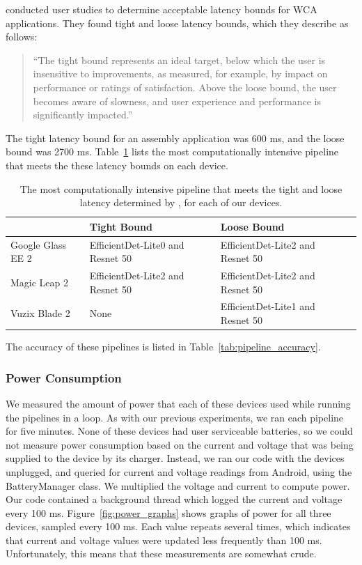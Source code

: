 \citet{chen2017} conducted user studies to determine acceptable latency bounds
for WCA applications.
They found tight and loose latency bounds, which they describe as follows:
\begin{quotation}
``The tight bound represents an ideal target, below which the
user is insensitive to improvements, as measured, for example,
by impact on performance or ratings of satisfaction. Above
the loose bound, the user becomes aware of slowness, and
user experience and performance is significantly impacted.''
\end{quotation}
The tight latency bound for an assembly application was 600 ms, and the loose
bound was 2700 ms. Table~\ref{tab:mobile_accuracy} lists the most
computationally intensive pipeline
that meets the these latency bounds on each device.

\begin{table}
\begin{tabular}{|l||l|l|l|}
  \hline
  & Tight Bound & Loose Bound\\
  \hline
  \hline
  Google Glass EE 2 & EfficientDet-Lite0 and Resnet 50 & EfficientDet-Lite2 and Resnet 50\\
  Magic Leap 2 & EfficientDet-Lite2 and Resnet 50 & EfficientDet-Lite2 and Resnet 50\\
  Vuzix Blade 2 & None & EfficientDet-Lite1 and Resnet 50\\
  \hline
\end{tabular}
  \begin{captiontext}
    The accuracy of these pipelines is listed in
    Table~\ref{tab:pipeline_accuracy}.
  \end{captiontext}
\caption{
  The most computationally intensive pipeline that meets the tight and loose
  latency determined by \citet{chen2017}, for each of our devices.
  }\label{tab:mobile_accuracy}
\end{table}

\subsubsection{Power Consumption}\label{sec:mobile_power_consumption}

We measured the amount of power that each of these devices used while running
the pipelines in a loop.
As with our previous experiments, we ran each pipeline for five minutes.
None of these devices had user serviceable batteries, so we could not measure
power consumption based on the current and voltage that was being
supplied to the device by its charger.
Instead, we ran our code with the devices unplugged, and queried for current and
voltage readings from Android, using the BatteryManager class.
We multiplied the voltage and current to compute power.
Our code contained a background thread which logged the current and voltage
every 100 ms.
Figure~\ref{fig:power_graphs} shows graphs of power for all three devices,
sampled every 100 ms.
Each value repeats several times, which indicates that current and voltage
values were updated less frequently than 100 ms.
Unfortunately, this means that these measurements are somewhat crude.

